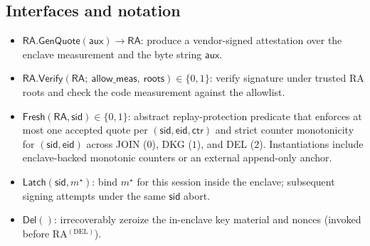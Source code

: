 \documentclass[runningheads,orivec]{llncs}
\newcommand{\sid}{\mathsf{sid}}
\begin{document}
\subsection*{Interfaces and notation}
\begin{itemize}[leftmargin=*,itemsep=0.25em]
  \item $\textsf{RA.GenQuote}(\mathsf{aux}) \rightarrow \mathsf{RA}$:
  produce a vendor-signed attestation over the enclave measurement and the byte string $\mathsf{aux}$.

  \item $\textsf{RA.Verify}(\mathsf{RA};\ \textsf{allow\_meas},\ \textsf{roots}) \in \{0,1\}$:
  verify signature under trusted RA roots and check the code measurement against the allowlist.

  \item $\textsf{Fresh}(\mathsf{RA},\mathsf{sid}) \in \{0,1\}$:
  abstract replay-protection predicate that enforces at most one accepted quote per $(\mathsf{sid},\mathsf{eid},\mathsf{ctr})$
  and strict counter monotonicity for $(\mathsf{sid},\mathsf{eid})$ across JOIN ($0$), DKG ($1$), and DEL ($2$).
  Instantiations include enclave-backed monotonic counters or an external append-only anchor.

  \item $\textsf{Latch}(\sid,m^{\star})$:
  bind $m^{\star}$ for this session inside the enclave; subsequent signing attempts under the same $\sid$ abort.

  \item $\textsf{Del}()$:
  irrecoverably zeroize the in-enclave key material and nonces (invoked before RA$^{(\mathrm{DEL})}$).
\end{itemize}
\end{document}
